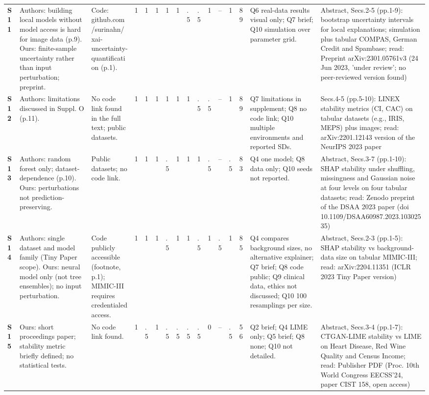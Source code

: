 \begin{longtable}{@{}P{1.0cm}P{4.6cm}P{3.6cm}P{0.3cm}P{0.3cm}P{0.3cm}P{0.3cm}P{0.3cm}P{0.3cm}P{0.3cm}P{0.3cm}P{0.3cm}P{0.36cm}P{0.75cm}P{3.0cm}P{3.9cm}@{}}
\textbf{S11} & Authors: building local models without model access is hard for image data (p.9). Ours: finite-sample uncertainty rather than input perturbation; preprint. & Code: github.com/\allowbreak{}surinahn/\allowbreak{}xai-uncertainty-quantification (p.1). & 1 & 1 & 1 & 1 & 1 & .5 & .5 & 1 & -- & 1 & 89 & Q6 real-data results visual only; Q7 brief; Q10 simulation over parameter grid. & Abstract, Secs.2-5 (pp.1-9): bootstrap uncertainty intervals for local explanations; simulation plus tabular COMPAS, German Credit and Spambase; read: Preprint arXiv:2301.05761v3 (24 Jun 2023, 'under review'; no peer-reviewed version found) \\
\textbf{S12} & Authors: limitations discussed in Suppl. O (p.11). & No code link found in the full text; public datasets. & 1 & 1 & 1 & 1 & 1 & 1 & .5 & .5 & -- & 1 & 89 & Q7 limitations in supplement; Q8 no code link; Q10 multiple environments and reported SDs. & Secs.4-5 (pp.5-10): LINEX stability metrics (CI, CAC) on tabular datasets (e.g., IRIS, MEPS) plus images; read: arXiv:2201.12143 version of the NeurIPS 2023 paper \\
\textbf{S13} & Authors: random forest only; dataset-dependence (p.10). Ours: perturbations not prediction-preserving. & Public datasets; no code link. & 1 & 1 & 1 & .5 & 1 & 1 & 1 & .5 & -- & .5 & 83 & Q4 one model; Q8 data only; Q10 seeds not reported. & Abstract, Secs.3-7 (pp.1-10): SHAP stability under shuffling, missingness and Gaussian noise at four levels on four tabular datasets; read: Zenodo preprint of the DSAA 2023 paper (doi 10.1109/\allowbreak{}DSAA60987.2023.10302535) \\
\textbf{S14} & Authors: single dataset and model family (Tiny Paper scope). Ours: neural model only (not tree ensembles); no input perturbation. & Code publicly accessible (footnote, p.1); MIMIC-III requires credentialed access. & 1 & 1 & 1 & .5 & 1 & 1 & .5 & 1 & .5 & 1 & 85 & Q4 compares background sizes, no alternative explainer; Q7 brief; Q8 code public; Q9 clinical data, ethics not discussed; Q10 100 resamplings per size. & Abstract, Secs.2-3 (pp.1-5): SHAP stability vs background-data size on tabular MIMIC-III; read: arXiv:2204.11351 (ICLR 2023 Tiny Paper version) \\
\textbf{S15} & Ours: short proceedings paper; stability metric briefly defined; no statistical tests. & No code link found. & 1 & .5 & 1 & .5 & .5 & .5 & .5 & 0 & -- & .5 & 56 & Q2 brief; Q4 LIME only; Q5 brief; Q8 none; Q10 not detailed. & Abstract, Secs.3-4 (pp.1-7): CTGAN-LIME stability vs LIME on Heart Disease, Red Wine Quality and Census Income; read: Publisher PDF (Proc. 10th World Congress EECSS'24, paper CIST 158, open access) \\

\end{longtable}

